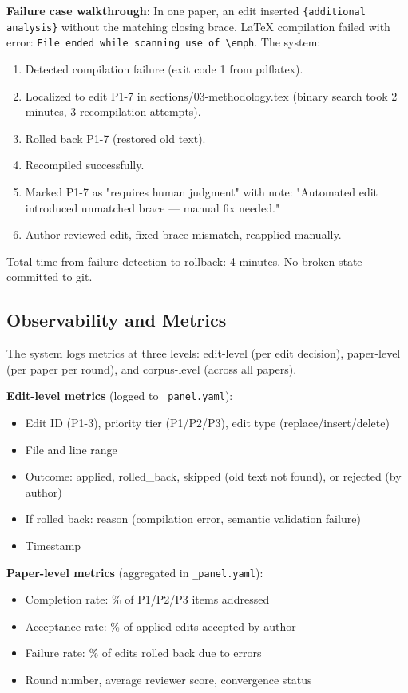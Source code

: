 \textbf{Failure case walkthrough}: In one paper, an edit inserted \texttt{\{additional analysis\}} without the matching closing brace. LaTeX compilation failed with error: \texttt{File ended while scanning use of \textbackslash{}emph}. The system:
\begin{enumerate}
\item Detected compilation failure (exit code 1 from pdflatex).
\item Localized to edit P1-7 in sections/03-methodology.tex (binary search took 2 minutes, 3 recompilation attempts).
\item Rolled back P1-7 (restored old text).
\item Recompiled successfully.
\item Marked P1-7 as "requires human judgment" with note: "Automated edit introduced unmatched brace — manual fix needed."
\item Author reviewed edit, fixed brace mismatch, reapplied manually.
\end{enumerate}

Total time from failure detection to rollback: 4 minutes. No broken state committed to git.

\subsection{Observability and Metrics}

The system logs metrics at three levels: edit-level (per edit decision), paper-level (per paper per round), and corpus-level (across all papers).

\textbf{Edit-level metrics} (logged to \texttt{\_panel.yaml}):
\begin{itemize}
\item Edit ID (P1-3), priority tier (P1/P2/P3), edit type (replace/insert/delete)
\item File and line range
\item Outcome: applied, rolled\_back, skipped (old text not found), or rejected (by author)
\item If rolled back: reason (compilation error, semantic validation failure)
\item Timestamp
\end{itemize}

\textbf{Paper-level metrics} (aggregated in \texttt{\_panel.yaml}):
\begin{itemize}
\item Completion rate: \% of P1/P2/P3 items addressed
\item Acceptance rate: \% of applied edits accepted by author
\item Failure rate: \% of edits rolled back due to errors
\item Round number, average reviewer score, convergence status
\end{itemize}

